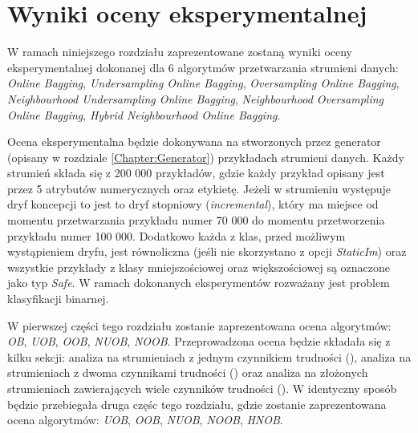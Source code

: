 \chapter{Wyniki oceny eksperymentalnej}
\label{Section:Results}

\noindent W ramach niniejszego rozdziału zaprezentowane zostaną wyniki oceny eksperymentalnej dokonanej dla 6 algorytmów przetwarzania strumieni danych: \textit{Online Bagging}, \textit{Undersampling Online Bagging}, \textit{Oversampling Online Bagging}, \textit{Neighbourhood Undersampling Online Bagging}, \textit{Neighbourhood Oversampling Online Bagging}, \textit{Hybrid Neighbourhood Online Bagging}.

Ocena eksperymentalna będzie dokonywana na stworzonych przez generator (opisany w rozdziale \ref{Chapter:Generator}) przykładach strumieni danych. Każdy strumień składa się z 200 000 przykładów, gdzie każdy przykład opisany jest przez 5 atrybutów numerycznych oraz etykietę. Jeżeli w strumieniu występuje dryf koncepcji to jest to dryf stopniowy (\textit{incremental}), który ma miejsce od momentu przetwarzania przykładu numer 70 000 do momentu przetworzenia przykładu numer 100 000. Dodatkowo każda z klas, przed możliwym wystąpieniem dryfu, jest równoliczna (jeśli nie skorzystano z opcji \textit{StaticIm}) oraz wszystkie przykłady z klasy mniejszościowej oraz większościowej są oznaczone jako typ \textit{Safe}. W ramach dokonanych eksperymentów rozważany jest problem klasyfikacji binarnej.

W pierwszej części tego rozdziału zostanie zaprezentowana ocena algorytmów: \textit{OB}, \textit{UOB}, \textit{OOB}, \textit{NUOB}, \textit{NOOB}. Przeprowadzona ocena będzie składała się z kilku sekcji: analiza na strumieniach z jednym czynnikiem trudności (), analiza na strumieniach z dwoma czynnikami trudności () oraz analiza na złożonych strumieniach zawierających wiele czynników trudności (). W identyczny sposób będzie przebiegała druga częśc tego rozdziału, gdzie zostanie zaprezentowana ocena algorytmów: \textit{UOB}, \textit{OOB}, \textit{NUOB}, \textit{NOOB}, \textit{HNOB}.

